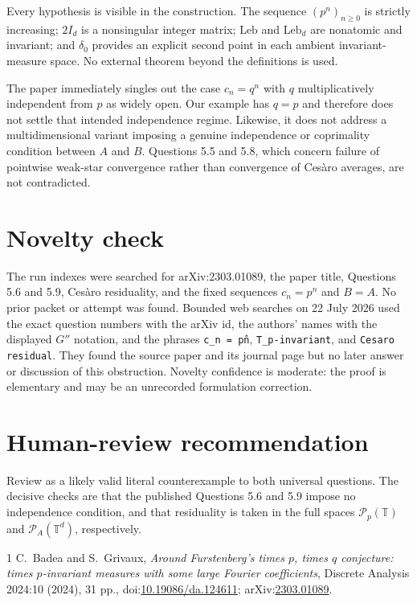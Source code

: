 \documentclass[11pt]{article}
\newcommand{\Torus}{\mathbb T}
\newcommand{\Prob}{\mathcal P}
\newcommand{\Leb}{\mathrm{Leb}}
\begin{document}
Every hypothesis is visible in the construction. The sequence
$(p^n)_{n\geq0}$ is strictly increasing; $2I_d$ is a nonsingular integer
matrix; $\Leb$ and $\Leb_d$ are nonatomic and invariant; and $\delta_0$
provides an explicit second point in each ambient invariant-measure space.
No external theorem beyond the definitions is used.

The paper immediately singles out the case $c_n=q^n$ with $q$
multiplicatively independent from $p$ as widely open. Our example has
$q=p$ and therefore does not settle that intended independence regime.
Likewise, it does not address a multidimensional variant imposing a genuine
independence or coprimality condition between $A$ and $B$. Questions 5.5
and 5.8, which concern failure of pointwise weak-star convergence rather
than convergence of Ces\`aro averages, are not contradicted.

\section{Novelty check}

The run indexes were searched for arXiv:2303.01089, the paper title,
Questions 5.6 and 5.9, Ces\`aro residuality, and the fixed sequences
$c_n=p^n$ and $B=A$. No prior packet or attempt was found. Bounded web
searches on 22 July 2026 used the exact question numbers with the arXiv id,
the authors' names with the displayed $G''$ notation, and the phrases
\texttt{c\_n = p\^n}, \texttt{T\_p-invariant}, and
\texttt{Cesaro residual}. They found the source paper and its journal
page but no later answer or discussion of this obstruction. Novelty
confidence is moderate: the proof is elementary and may be an unrecorded
formulation correction.

\section{Human-review recommendation}

Review as a likely valid literal counterexample to both universal questions.
The decisive checks are that the published Questions 5.6 and 5.9 impose no
independence condition, and that residuality is taken in the full spaces
$\Prob_p(\Torus)$ and $\Prob_A(\Torus^d)$, respectively.

\begin{thebibliography}{1}
C.~Badea and S.~Grivaux,
\emph{Around Furstenberg's times $p$, times $q$ conjecture: times
$p$-invariant measures with some large Fourier coefficients},
Discrete Analysis 2024:10 (2024), 31 pp.,
doi:\href{https://doi.org/10.19086/da.124611}{10.19086/da.124611};
arXiv:\href{https://arxiv.org/abs/2303.01089}{2303.01089}.
\end{thebibliography}
\end{document}
